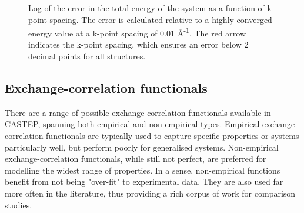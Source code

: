 \begin{figure}
\begin{center}
		\caption{Log of the error in the total energy of the system as a function of k-point spacing. The error is calculated relative to a highly converged energy value at a k-point spacing of 0.01 \r{A}\textsuperscript{-1}. The red arrow indicates the k-point spacing, which ensures an error below 2 decimal points for all structures.}
		\label{Figure:kpoint_convergence}
	\end{center}
\end{figure}

\subsection{Exchange-correlation functionals}

There are a range of possible exchange-correlation functionals available in CASTEP, spanning both empirical and non-empirical types. Empirical exchange-correlation functionals are typically used to capture specific properties or systems particularly well, but perform poorly for generalised systems. Non-empirical exchange-correlation functionals, while still not perfect, are preferred for modelling the widest range of properties. In a sense, non-empirical functions benefit from not being "over-fit" to experimental data. They are also used far more often in the literature, thus providing a rich corpus of work for comparison studies.

